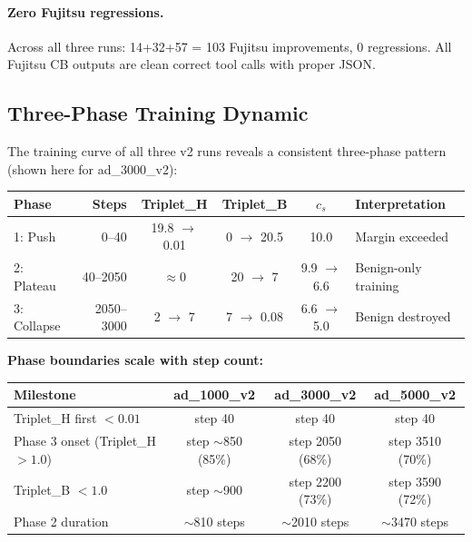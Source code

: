 \documentclass[11pt]{article}
\begin{document}
\paragraph{Zero Fujitsu regressions.} Across all three runs: 14+32+57 = 103
Fujitsu improvements, 0 regressions. All Fujitsu CB outputs are clean correct
tool calls with proper JSON.

\subsection{Three-Phase Training Dynamic}
\label{sec:phases}

The training curve of all three v2 runs reveals a consistent three-phase
pattern (shown here for ad\_3000\_v2):

\begin{center}
\small
\begin{tabular}{lrcccl}
\toprule
Phase & Steps & Triplet\_H & Triplet\_B & $c_s$ & Interpretation \\
\midrule
1: Push     & 0--40       & 19.8 $\to$ 0.01 & 0 $\to$ 20.5  & 10.0 & Margin exceeded \\
2: Plateau  & 40--2050    & $\approx 0$      & 20 $\to$ 7    & 9.9 $\to$ 6.6 & Benign-only training \\
3: Collapse & 2050--3000  & 2 $\to$ 7        & 7 $\to$ 0.08  & 6.6 $\to$ 5.0 & Benign destroyed \\
\bottomrule
\end{tabular}
\end{center}

\textbf{Phase boundaries scale with step count:}

\begin{center}
\small
\begin{tabular}{lccc}
\toprule
Milestone & ad\_1000\_v2 & ad\_3000\_v2 & ad\_5000\_v2 \\
\midrule
Triplet\_H first $< 0.01$ & step 40 & step 40 & step 40 \\
Phase 3 onset (Triplet\_H $> 1.0$) & step $\sim$850 (85\%) & step 2050 (68\%) & step 3510 (70\%) \\
Triplet\_B $< 1.0$ & step $\sim$900 & step 2200 (73\%) & step 3590 (72\%) \\
Phase 2 duration & $\sim$810 steps & $\sim$2010 steps & $\sim$3470 steps \\
\bottomrule
\end{tabular}
\end{center}
\end{document}
